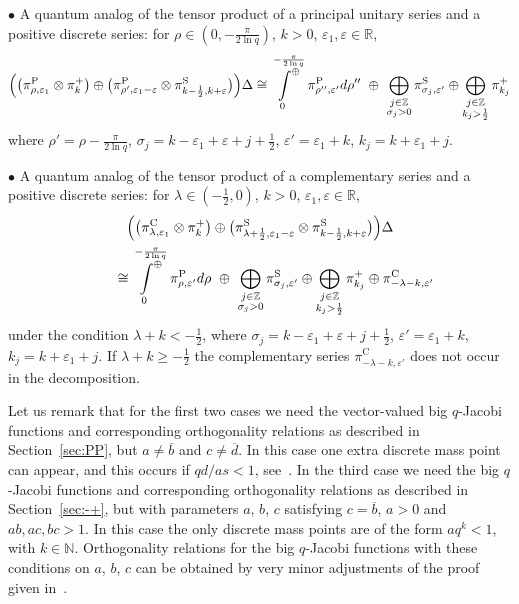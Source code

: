 \documentclass[pdftex]{sigma}
\numberwithin{equation}{section}
\numberwithin{theorem}{section}
\numberwithin{proposition}{section}
\numberwithin{lemma}{section}
\numberwithin{corollary}{section}
\numberwithin{definition}{section}
\numberwithin{example}{section}
\numberwithin{remark}{section}
\numberwithin{note}{section}
\newcommand{\R}{\mathbb R}
\newcommand{\N}{\mathbb N}
\newcommand{\Z}{\mathbb Z}
\newcommand{\eps}{\varepsilon}
\newcommand{\dirint}[2]{\sideset{}{^\oplus}\int\limits_{#1\ }^{\ \ #2}}
\begin{document}
$\bullet$ A quantum analog of the tensor product of a principal unitary series and a positive discrete series:
for $\rho \in (0,-\frac{\pi}{2\ln q})$, $k>0$, $\eps_1,\eps \in \R$,
\begin{gather*}
\Big(\big(\pi_{\rho,\eps_1}^{\mathrm{P}} \otimes \pi^+_k\big) \oplus \big(\pi_{\rho',\eps_1-\eps}^{\mathrm{P}} \otimes \pi_{k-\frac12,k+\eps}^{\mathrm{S}}\big)\Big)\Delta \cong
\dirint{0}{-\frac{\pi}{2 \ln q}} \pi^{\mathrm P}_{\rho'',\eps'} d\rho''\ \oplus\ \bigoplus_{\substack{j\in\Z\\ \sigma_j>0}} \pi_{\sigma_j,\eps'}^{\mathrm S} \oplus \bigoplus_{\substack{j\in\Z\\ k_j>\frac12}} \pi^+_{k_j}
\end{gather*}
where $\rho'=\rho-\frac{\pi}{2\ln q}$, $\sigma_j = k-\eps_1+\eps+j+\frac12$, $\eps'= \eps_1+k$, $k_j=k+\eps_1+j$.

$\bullet$ A quantum analog of the tensor product of a complementary series and a positive discrete series:
for $\lambda \in (-\frac12,0)$, $k>0$, $\eps_1,\eps \in \mathbb R$,
\begin{gather*}
\Big(\big(\pi_{\lambda,\eps_1}^{\mathrm{C}}  \otimes \pi^+_k\big) \oplus \big(\pi_{\lambda+\frac12,\eps_1-\eps}^{\mathrm{S}} \otimes \pi_{k-\frac12,k+\eps}^{\mathrm{S}}\big)\Big)\Delta \\
\qquad{} \cong  \dirint{0}{-\frac{\pi}{2 \ln q}} \pi^{\mathrm P}_{\rho,\eps'} d\rho\ \oplus\ \bigoplus_{\substack{j\in\Z\\ \sigma_j>0}} \pi_{\sigma_j,\eps'}^{\mathrm S} \oplus \bigoplus_{\substack{j\in\Z\\ k_j>\frac12}} \pi^+_{k_j} \oplus \pi_{-\lambda-k,\eps'}^{\mathrm{C}}
\end{gather*}
under the condition $\lambda+k<-\frac12$, where $\sigma_j = k-\eps_1+\eps+j+\frac12$, $\eps'= \eps_1+k$, $k_j=k+\eps_1+j$. If $\lambda + k \geq -\frac12$ the complementary series $\pi_{-\lambda-k,\eps'}^{\mathrm{C}}$ does not occur in the decomposition.


Let us remark that for the f\/irst two cases we need the vector-valued big $q$-Jacobi functions and corresponding orthogonality relations as described in Section~\ref{sec:PP}, but $a \neq \overline{b}$ and $c \neq \overline{d}$. In this case one extra discrete mass point can appear, and this occurs if $qd/as<1$, see~\cite{Gr09}. In the third case we need the big $q$-Jacobi functions and corresponding orthogonality relations as described in Section~\ref{sec:-+}, but with parameters $a$, $b$, $c$ satisfying $c=\overline{b}$, $a>0$ and $ab,ac,bc>1$. In this case the only discrete mass points are of the form $aq^k<1$, with $k \in \N$. Orthogonality relations for the big $q$-Jacobi functions with these conditions on $a$, $b$, $c$ can be obtained by very minor adjustments of the proof given in~\cite{KS03}.
\end{document}

